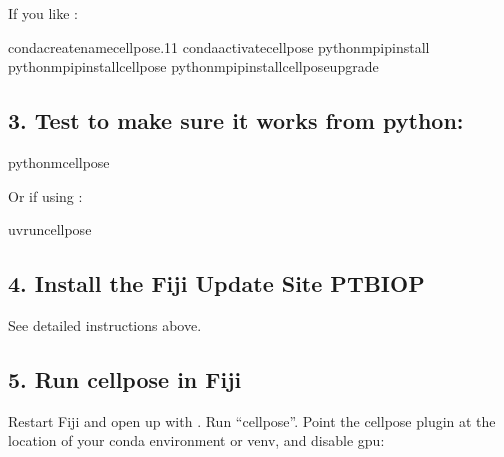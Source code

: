 \documentclass[letterpaper,10pt,english]{jupyterBook}
\begin{document}
\sphinxAtStartPar
If you like :

\begin{sphinxVerbatim}[commandchars=\\\{\}]
condacreate\PYGZhy{}\PYGZhy{}namecellpose.11
condaactivatecellpose
python\PYGZhy{}mpipinstall
python\PYGZhy{}mpipinstallcellpose
python\PYGZhy{}mpipinstallcellpose\PYGZhy{}\PYGZhy{}upgrade
\end{sphinxVerbatim}


\subsection{3. Test to make sure it works from python:}
\label{\detokenize{cellpose:test-to-make-sure-it-works-from-python}}
\begin{sphinxVerbatim}[commandchars=\\\{\}]
python\PYGZhy{}mcellpose
\end{sphinxVerbatim}

\sphinxAtStartPar
Or if using :

\begin{sphinxVerbatim}[commandchars=\\\{\}]
uvruncellpose
\end{sphinxVerbatim}

\sphinxAtStartPar
{}


\subsection{4. Install the Fiji Update Site PTBIOP}
\label{\detokenize{cellpose:install-the-fiji-update-site-ptbiop}}
\sphinxAtStartPar
See detailed instructions above.


\subsection{5. Run cellpose in Fiji}
\label{\detokenize{cellpose:run-cellpose-in-fiji}}
\sphinxAtStartPar
Restart Fiji and open up  with . Run “cellpose”.  Point the cellpose plugin at the location of your conda environment or venv, and disable gpu:
\end{document}

